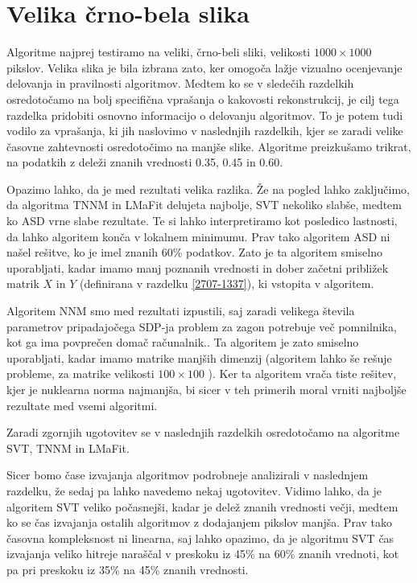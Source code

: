\section{Velika črno-bela slika} \label{1307-2250}
Algoritme najprej testiramo na veliki, črno-beli sliki, velikosti $1000\times1000$ pikslov. Velika slika je bila izbrana zato, ker omogoča lažje vizualno ocenjevanje delovanja in pravilnosti algoritmov.
Medtem ko se v sledečih razdelkih osredotočamo na bolj specifična vprašanja o kakovosti rekonstrukcij, je cilj tega razdelka pridobiti osnovno informacijo o delovanju algoritmov. 
To je potem tudi vodilo za vprašanja, ki
jih naslovimo v naslednjih razdelkih, kjer
se zaradi velike časovne zahtevnosti osredotočimo na manjše slike. Algoritme preizkušamo trikrat, na podatkih z deleži znanih vrednosti 0.35, 0.45  in 0.60.


\FloatBarrier


Opazimo lahko, da je med rezultati velika razlika. Že na pogled lahko zaključimo, da algoritma TNNM in LMaFit delujeta najbolje, SVT nekoliko slabše, medtem ko
ASD vrne slabe rezultate. Te si lahko interpretiramo kot posledico lastnosti, da lahko algoritem konča v lokalnem minimumu. Prav tako algoritem ASD ni našel rešitve, ko je imel znanih 60\% podatkov. Zato je ta algoritem smiselno uporabljati, kadar imamo manj poznanih vrednosti in dober začetni približek matrik $X$ in $Y$ (definirana v razdelku \ref{2707-1337}), ki vstopita v algoritem.

Algoritem NNM smo med rezultati izpustili, saj zaradi velikega števila parametrov pripadajočega SDP-ja problem za zagon potrebuje več pomnilnika, kot ga ima povprečen domač računalnik.. Ta algoritem je zato smiselno uporabljati, kadar imamo matrike manjših dimenzij (algoritem lahko še rešuje probleme, za matrike velikosti $100 \times 100$ \cite{NNM-Candes}). 
Ker ta algoritem vrača tiste rešitev, kjer je nuklearna norma najmanjša, bi sicer v teh primerih moral vrniti najboljše rezultate med vsemi algoritmi. 

Zaradi zgornjih ugotovitev se v naslednjih razdelkih osredotočamo na algoritme SVT, TNNM in LMaFit.

Sicer bomo čase izvajanja algoritmov podrobneje analizirali v naslednjem razdelku, že sedaj pa lahko navedemo nekaj ugotovitev. Vidimo lahko, da je algoritem SVT veliko počasnejši, kadar je delež znanih vrednosti večji, medtem ko se čas izvajanja ostalih algoritmov z dodajanjem pikslov manjša. Prav tako časovna kompleksnost ni linearna, saj lahko opazimo, da je algoritmu SVT čas izvajanja veliko hitreje naraščal v preskoku iz 45\% na 60\% znanih vrednoti, kot pa pri preskoku iz 35\% na 45\% znanih vrednosti.

